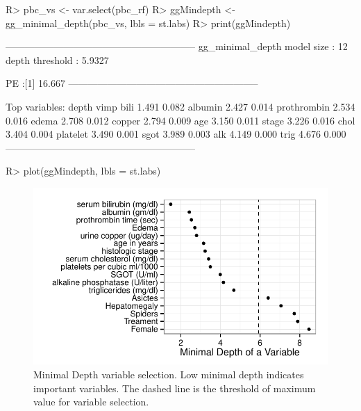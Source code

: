 \documentclass[nojss]{jss}\usepackage[]{graphicx}\usepackage[]{color}
\makeatletter
\def\maxwidth{ %
  \ifdim\Gin@nat@width>\linewidth
    \linewidth
  \else
    \Gin@nat@width
  \fi
}
\makeatother
\begin{document}
\begin{Schunk}
\begin{Sinput}
R> pbc_vs <- var.select(pbc_rf)
R> ggMindepth <- gg_minimal_depth(pbc_vs, lbls = st.labs)
R> print(ggMindepth)
\end{Sinput}
\end{Schunk}

\begin{Schunk}
\begin{Soutput}
-----------------------------------------------------------
gg_minimal_depth
model size         : 12 
depth threshold    : 5.9327 

PE :[1] 16.667
-----------------------------------------------------------

Top variables:
            depth  vimp
bili        1.491 0.082
albumin     2.427 0.014
prothrombin 2.534 0.016
edema       2.708 0.012
copper      2.794 0.009
age         3.150 0.011
stage       3.226 0.016
chol        3.404 0.004
platelet    3.490 0.001
sgot        3.989 0.003
alk         4.149 0.000
trig        4.676 0.000
-----------------------------------------------------------
\end{Soutput}
\end{Schunk}

\begin{Schunk}
\begin{Sinput}
R> plot(ggMindepth, lbls = st.labs)
\end{Sinput}
\begin{figure}[!htpb]

{\centering \includegraphics[width=\maxwidth]{figure/rfs-mindepth-plot-1} 

}

\caption[Minimal Depth variable selection]{Minimal Depth variable selection. Low minimal depth indicates important variables. The dashed line is the threshold of maximum value for variable selection.\label{fig:mindepth-plot}}
\end{figure}
\end{Schunk}
\end{document}
